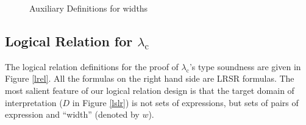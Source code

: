 \documentclass[preprint]{sigplanconf}
\newcommand{\logo}{\lambda_\mathrm{c}}
\begin{document}
\begin{figure}
\caption{\label{width-aux}Auxiliary Definitions for widths}
\end{figure}

\subsection {\label{subsection-proof}Logical Relation for $\logo$}

The logical relation definitions for the proof of $\logo$'s type soundness are given in Figure \ref{lrel}. All the formulas on the right hand side are LRSR formulas. The most salient feature of our logical relation design is that the target domain of interpretation ($D$ in Figure \ref{lslr}) is not sets of expressions, but sets of pairs of expression and ``width'' (denoted by $w$). 
\end{document}
